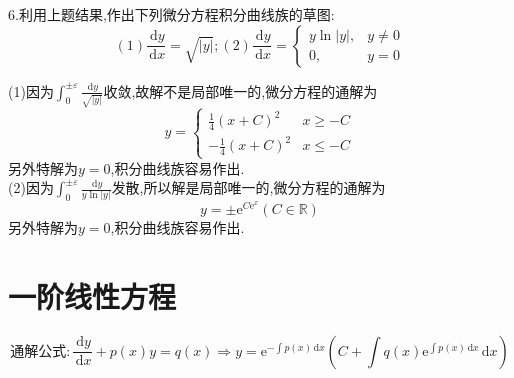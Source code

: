 \documentclass[titlepage,11pt,a4paper,twoside]{report}
\makeatletter
\newcommand\diff{\,\mathrm{d}}
\newcommand\e{\mathrm{e}}
\newenvironment{solve}{\par
	\pushQED{\qed}%
	\normalfont \topsep1\p@\@plus6\p@\relax
	\trivlist
	\item\relax
	{\hspace*{\parindent}{\heiti 解}\@addpunct{:}}\hspace\labelsep\ignorespaces
}{%
	\popQED\endtrivlist\@endpefalse
}
\makeatother
\begin{document}
6.利用上题结果,作出下列微分方程积分曲线族的草图:\\
\[(1)\frac{\diff y}{\diff x}=\sqrt{|y|};(2)\frac{\diff y}{\diff x}=\begin{cases}y\ln|y|,&y\neq0\\0,&y=0\end{cases}\]
\begin{solve}
(1)因为$\int_0^{\pm\varepsilon}\frac{\diff y}{\sqrt{|y|}}$收敛,故解不是局部唯一的,微分方程的通解为
\[y=\begin{cases}\frac{1}{4}(x+C)^2&x\geq-C\\-\frac{1}{4}(x+C)^2&x\leq-C\end{cases}\]
另外特解为$y=0$,积分曲线族容易作出.\\
(2)因为$\int_0^{\pm\varepsilon}\frac{\diff y}{y\ln|y|}$发散,所以解是局部唯一的,微分方程的通解为
\[y=\pm\e^{C\e^x}(C\in\mathbb{R})\]
另外特解为$y=0$,积分曲线族容易作出.
\end{solve}
\section{一阶线性方程}
\[通解公式:\frac{\diff y}{\diff x}+p(x)y=q(x)\Longrightarrow y=\e^{-\int p(x)\diff x}\left(C+\int q(x)\e^{\int p(x)\diff x}\diff x\right)\]
\end{document}
